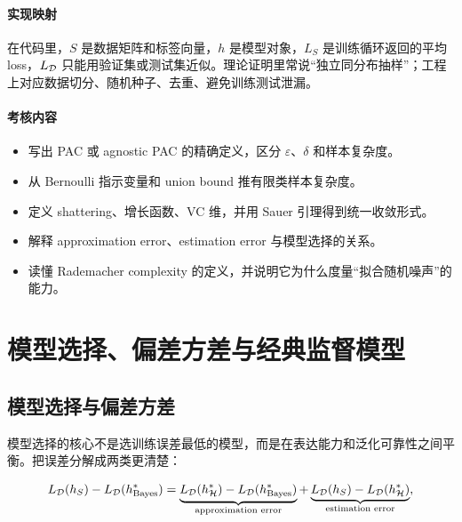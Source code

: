\documentclass[11pt]{ctexart}
\begin{document}
\paragraph{实现映射}

在代码里，\(S\) 是数据矩阵和标签向量，\(h\) 是模型对象，\(L_S\) 是训练循环返回的平均 loss，\(L_{\mathcal{D}}\) 只能用验证集或测试集近似。理论证明里常说“独立同分布抽样”；工程上对应数据切分、随机种子、去重、避免训练测试泄漏。

\paragraph{考核内容}

\begin{itemize}
  \item 写出 PAC 或 agnostic PAC 的精确定义，区分 \(\varepsilon\)、\(\delta\) 和样本复杂度。
  \item 从 Bernoulli 指示变量和 union bound 推有限类样本复杂度。
  \item 定义 shattering、增长函数、VC 维，并用 Sauer 引理得到统一收敛形式。
  \item 解释 approximation error、estimation error 与模型选择的关系。
  \item 读懂 Rademacher complexity 的定义，并说明它为什么度量“拟合随机噪声”的能力。
\end{itemize}

\section{模型选择、偏差方差与经典监督模型}


\subsection{模型选择与偏差方差}


模型选择的核心不是选训练误差最低的模型，而是在表达能力和泛化可靠性之间平衡。把误差分解成两类更清楚：

\[
  L_{\mathcal{D}}(h_S)-L_{\mathcal{D}}(h^*_{\mathrm{Bayes}})
  =
  \underbrace{
    L_{\mathcal{D}}(h^*_{\mathcal{H}})-L_{\mathcal{D}}(h^*_{\mathrm{Bayes}})
  }_{\text{approximation error}}
  +
  \underbrace{
    L_{\mathcal{D}}(h_S)-L_{\mathcal{D}}(h^*_{\mathcal{H}})
  }_{\text{estimation error}},
\]
\end{document}
